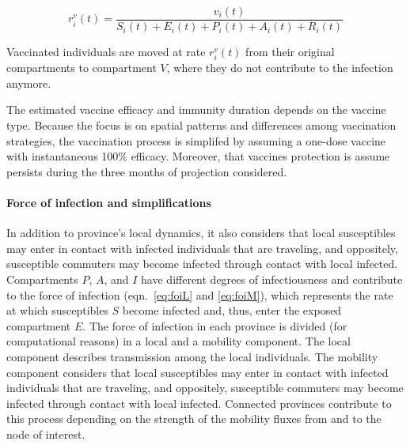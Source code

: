 \begin{equation}
r^v_i(t) = \frac{v_{i}(t)}{S_i(t) +  E_i(t) + P_i(t) + A_i(t) + R_i(t)}
\end{equation}

Vaccinated individuals are moved at rate $r^v_i(t)$ from their original compartments to compartment $V$, where they do not contribute to the infection anymore.

The estimated vaccine efficacy and immunity duration depends on the vaccine type. Because the focus is on spatial patterns and differences among vaccination strategies, the vaccination process is simplifed by assuming a one-dose vaccine with instantaneous 100\% efficacy. %
Moreover, that vaccines protection is assume persists during the three months of projection considered.

\paragraph{Force of infection and simplifications}

In addition to province's local dynamics, it also considers that local susceptibles may enter in contact with infected individuals that are traveling, and oppositely, susceptible commuters may become infected through contact with local infected. Compartments $P$, $A$, and $I$ have different degrees of infectiousness and contribute to the force of infection (eqn.~\eqref{eq:foiL} and \eqref{eq:foiM}), which represents the rate at which susceptibles $S$ become infected and, thus, enter the exposed compartment $E$. The force of infection in each province is divided (for computational reasons) in a local and a mobility component. The local component describes transmission among the local individuals. The mobility component considers that local susceptibles may enter in contact with infected individuals that are traveling, and oppositely, susceptible commuters may become infected through contact with local infected. Connected provinces contribute to this process depending on the strength of the mobility fluxes from and to the node of interest.

